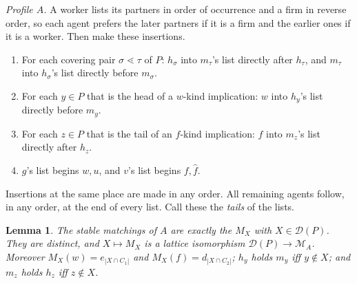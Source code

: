 \documentclass[11pt]{amsart}
\newtheorem{lemma}[theorem]{Lemma}
\theoremstyle{definition}
\theoremstyle{remark}
\newcommand{\D}{\mathcal D}
\begin{document}
\emph{Profile $A$.} A worker lists its partners in order of occurrence and a firm in reverse order, so each agent prefers the later partners if it is a firm and the earlier ones if it is a worker. Then make these insertions.
\begin{enumerate}[label=(I\arabic*)]
\item For each covering pair $\sigma\lessdot\tau$ of $P$: $h_\sigma$ into $m_\tau$'s list directly after $h_\tau$, and $m_\tau$ into $h_\sigma$'s list directly before $m_\sigma$.
\item For each $y\in P$ that is the head of a $w$-kind implication: $w$ into $h_y$'s list directly before $m_y$.
\item For each $z\in P$ that is the tail of an $f$-kind implication: $f$ into $m_z$'s list directly after $h_z$.
\item $g$'s list begins $w,u$, and $v$'s list begins $f,\hat f$.
\end{enumerate}
Insertions at the same place are made in any order. All remaining agents follow, in any order, at the end of every list. Call these the \emph{tails} of the lists.

\begin{lemma}\label{lem:A}
The stable matchings of $A$ are exactly the $M_X$ with $X\in\D(P)$. They are distinct, and $X\mapsto M_X$ is a lattice isomorphism $\D(P)\to\mathcal M_A$. Moreover $M_X(w)=e_{|X\cap C_1|}$ and $M_X(f)=d_{|X\cap C_2|}$; $h_y$ holds $m_y$ iff $y\notin X$; and $m_z$ holds $h_z$ iff $z\notin X$.
\end{lemma}
\end{document}
